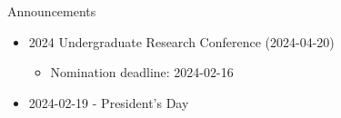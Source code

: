 \begin{frame}{Announcements}
    \begin{itemize}
        \item 2024 Undergraduate Research Conference (2024-04-20)
              \begin{itemize}
                  \item Nomination deadline: 2024-02-16
              \end{itemize}
        \item 2024-02-19 - President's Day
    \end{itemize}
\end{frame}